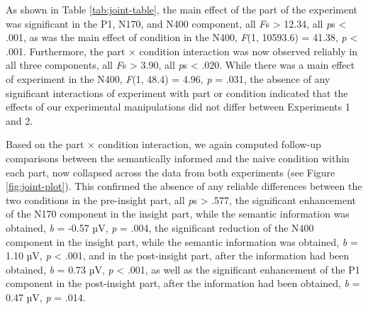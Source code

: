 \documentclass[
  english,
  doc,12pt,twoside,floatsintext]{apa7}
\begin{document}
As shown in Table \ref{tab:joint-table}, the main effect of the part of the experiment was significant in the P1, N170, and N400 component, all \emph{F}s \textgreater{} 12.34, all \emph{p}s \textless{} .001, as was the main effect of condition in the N400, \emph{F}(1, 10593.6) = 41.38, \emph{p} \textless{} .001. Furthermore, the part × condition interaction was now observed reliably in all three components, all \emph{F}s \textgreater{} 3.90, all \emph{p}s \textless{} .020. While there was a main effect of experiment in the N400, \emph{F}(1, 48.4) = 4.96, \emph{p} = .031, the absence of any significant interactions of experiment with part or condition indicated that the effects of our experimental manipulations did not differ between Experiments 1 and 2.

Based on the part × condition interaction, we again computed follow-up comparisons between the semantically informed and the naive condition within each part, now collapsed across the data from both experiments (see Figure \ref{fig:joint-plot}). This confirmed the absence of any reliable differences between the two conditions in the pre-insight part, all \emph{p}s \textgreater{} .577, the significant enhancement of the N170 component in the insight part, while the semantic information was obtained, \emph{b} = -0.57 µV, \emph{p} = .004, the significant reduction of the N400 component in the insight part, while the semantic information was obtained, \emph{b} = 1.10 µV, \emph{p} \textless{} .001, and in the post-insight part, after the information had been obtained, \emph{b} = 0.73 µV, \emph{p} \textless{} .001, as well as the significant enhancement of the P1 component in the post-insight part, after the information had been obtained, \emph{b} = 0.47 µV, \emph{p} = .014.
\end{document}
